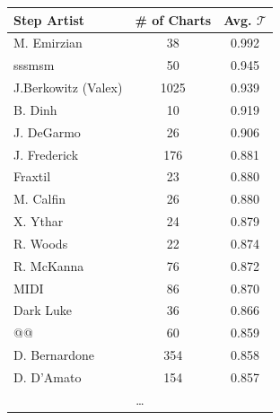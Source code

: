 \documentclass[10pt]{sigplanconf}
\begin{document}
\begin{table}[t]
	\begin{center}
		\small
	\begin{tabular}{l|c|c}
		Step Artist & \# of Charts & Avg. $\mathcal{T}$ \\
		\hline
		M. Emirzian	& 38	& 0.992 \\
		sssmsm		& 50	& 0.945 \\
		J.Berkowitz (Valex)	& 1025	& 0.939 \\
		B. Dinh		& 10	& 0.919 \\
		J. DeGarmo	& 26	& 0.906 \\
		J. Frederick	& 176	& 0.881 \\
		Fraxtil		& 23	& 0.880 \\
		M. Calfin	& 26	& 0.880 \\
		X. Ythar	& 24	& 0.879 \\
		R. Woods	& 22	& 0.874 \\
		R. McKanna	& 76	& 0.872 \\
		MIDI		& 86	& 0.870 \\
		Dark Luke	& 36	& 0.866 \\
		@@		& 60	& 0.859 \\
		D. Bernardone	& 354	& 0.858 \\
		D. D'Amato	& 154	& 0.857 \\
		\multicolumn{3}{c}{\normalsize\dots} \\

\end{tabular}
\end{center}
\end{table}
\end{document}
